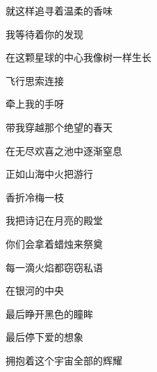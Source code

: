 \documentclass[UTF8]{article}
\begin{document}
\par 就这样追寻着温柔的香味
\par 我等待着你的发现
\par 在这颗星球的中心我像树一样生长
\par 飞行思索连接
\\[0.6cm]
\par 牵上我的手呀
\par 带我穿越那个绝望的春天
\par 在无尽欢喜之池中逐渐窒息
\par 正如山海中火把游行
\\[0.6cm]
\par 香折冷梅一枝
\par 我把诗记在月亮的殿堂
\par 你们会拿着蜡烛来祭奠
\par 每一滴火焰都窃窃私语
\\[0.6cm]
\par 在银河的中央
\par 最后睁开黑色的瞳眸
\par 最后停下爱的想象
\par 拥抱着这个宇宙全部的辉耀
\end{document}
